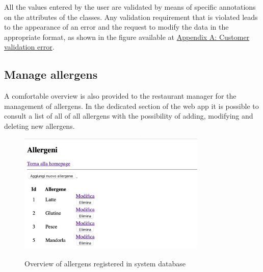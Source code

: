 \documentclass{article}
\begin{document}
    All the values entered by the user are validated by means of specific annotations on the attributes of the classes. Any validation requirement that is violated leads to the appearance of an error and the request to modify the data in the appropriate format, as shown in the figure available at \hyperref[fig:customer_validation_error]{Appendix A: Customer validation error}.


    \subsection*{Manage allergens}
    A comfortable overview is also provided to the restaurant manager for the management of allergens. In the dedicated section of the web app it is possible to consult a list of all of all allergens with the possibility of adding, modifying and deleting new allergens.

    \begin{figure}[H]
        \centering
        \includegraphics[width=0.8\textwidth]{images/allergens_overview.png}
        \label{fig:allergens_overview}
        \caption{Overview of allergens registered in system database}
    \end{figure}
\end{document}
